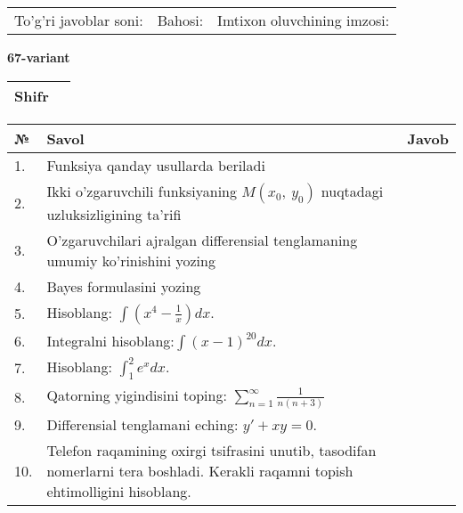 \documentclass{article}
\begin{document}
  \vspace{1cm}
  
  \begin{tabular}{lll}
  To'g'ri javoblar soni: \underline{\hspace{1.5cm}} & 
  Bahosi: \underline{\hspace{1.5cm}} & 
  Imtixon oluvchining imzosi: \underline{\hspace{2cm}} \\
  \end{tabular}
  
  \egroup
  
  \newpage
  
  
  \textbf{67-variant}\\
  
  \bgroup
  \def\arraystretch{1.6} %
  
  \begin{tabular}{|m{5.7cm}|m{9.5cm}|}
  \hline
  Shifr & \\
  \hline
  \end{tabular}
  
  \vspace{1cm}
  
  \begin{tabular}{|m{0.7cm}|m{10cm}|m{4cm}|}
  \hline
  № & Savol & Javob \\
  \hline
  1. & Funksiya qanday usullarda beriladi &  \\
  \hline
  2. & Ikki o'zgaruvchili funksiyaning \(M(x_{0},\ y_{0})\) nuqtadagi uzluksizligining ta'rifi &  \\
  \hline
  3. & O'zgaruvchilari ajralgan differensial tenglamaning umumiy ko'rinishini yozing &  \\
  \hline
  4. & Bayes formulasini yozing &  \\
  \hline
  5. & Hisoblang: \(\int \left( x^{4} - \frac{1}{x} \right)dx\). &  \\
  \hline
  6. & Integralni hisoblang:\(\int {(x - 1)^{20}}dx\). &  \\
  \hline
  7. & Hisoblang: \(\int_{1}^{2}{e^{x}dx}\). &  \\
  \hline
  8. & Qatorning yigindisini toping: \(\sum_{n = 1}^{\infty}\frac{1}{n(n + 3)}\) &  \\
  \hline
  9. & Differensial tenglamani eching: \(y' + xy = 0\). &  \\
  \hline
  10. & Telefon raqamining oxirgi tsifrasini unutib, tasodifan nomerlarni tera boshladi. Kerakli raqamni topish ehtimolligini hisoblang. &  \\
  \hline
  \end{tabular}
  
\end{document}
